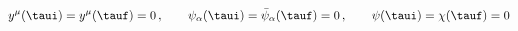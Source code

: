 \begin{equation}
y^\mu(\taui)=y^\mu(\tauf)=0\,,~~~~~~
\psi_\alpha(\taui)=\bar{\psi}_\alpha(\tauf)=0\,,~~~~~~
\psi(\taui)=\chi(\tauf)=0
\end{equation}

